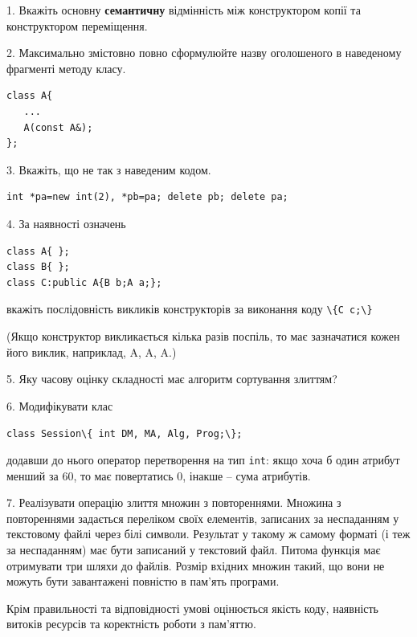 \documentclass[12pt, ukrainian]{article}
\def\code#1{\Verb!#1!}
\begin{document}
{%
1. Вкажіть основну \textbf{семантичну} відмінність між конструктором копії та конструктором переміщення.%
\par
\vspace{2mm}
2. Максимально змістовно повно сформулюйте назву оголошеного в наведеному фрагменті методу класу.
\vspace{-3mm}
\begin{verbatim}class A{
   ...
   A(const A&);
};\end{verbatim}
\vspace{-3mm}
\par
\vspace{2mm}
3. Вкажіть, що не так з наведеним кодом.
\vspace{-3mm}
\begin{verbatim}int *pa=new int(2), *pb=pa; delete pb; delete pa;\end{verbatim}
\vspace{-3mm}
\par
\vspace{2mm}
4. За наявності означень
\vspace{-3mm}
\begin{verbatim}
class A{ };
class B{ };
class C:public A{B b;A a;};\end{verbatim}
\vspace{-3mm}
вкажіть послідовність викликів конструкторів за виконання коду \code{\{C c;\}} 

(Якщо конструктор викликається кілька разів поспіль, то має зазначатися кожен його виклик, наприклад, A, A, A.)

\vspace{2mm}
5. Яку часову оцінку складності має алгоритм сортування злиттям?
\par
\vspace{2mm}
6. Модифікувати клас 

\qquad\code{class Session\{ int DM, MA, Alg, Prog;\};} 


додавши до нього оператор перетворення на тип \code{int}: якщо хоча б один атрибут менший за 60, то має повертатись 0, інакше -- сума атрибутів.%
\par
\vspace{2mm}
7. 
Реалізувати операцію злиття множин з повтореннями. Множина з повтореннями задається переліком своїх елементів, записаних за неспаданням у текстовому файлі через білі символи. Результат у такому ж самому форматі (і теж за неспаданням) має бути записаний у текстовий файл. Питома функція має отримувати три шляхи до файлів. Розмір вхідних множин такий, що вони не можуть бути завантажені повністю в пам’ять програми.

Крім правильності та відповідності умові оцінюється якість коду, наявність витоків ресурсів та коректність роботи з пам'яттю. 

}
\end{document}

